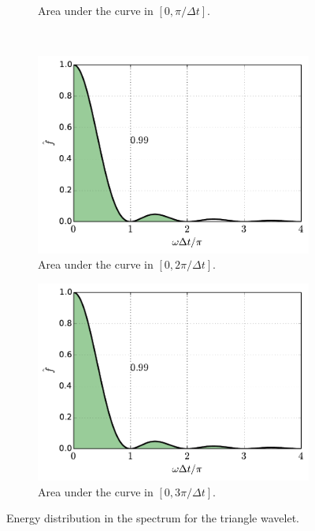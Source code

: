 \documentclass[12pt,letterpaper]{article}
\begin{document}
{\begin{figure}[h]
\begin{subfigure}[b]{0.45\textwidth}
        \caption{Area under the curve in $[0,\pi/\Delta t]$.}
    \end{subfigure}\\
    \begin{subfigure}[b]{0.45\textwidth}
        \includegraphics[width=\textwidth]{img/triangle_area=3.pdf}
        \caption{Area under the curve in $[0,2\pi/\Delta t]$.}
    \end{subfigure}
    \begin{subfigure}[b]{0.45\textwidth}
        \includegraphics[width=\textwidth]{img/triangle_area=4.pdf}
        \caption{Area under the curve in $[0,3\pi/\Delta t]$.}
    \end{subfigure}
    \caption{Energy distribution in the spectrum for the triangle wavelet.}
    \label{fig:triangle-areas}
\end{figure}



}
\end{document}
